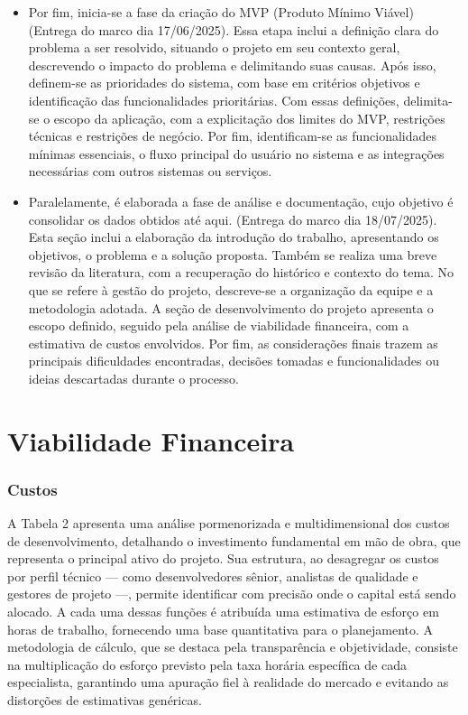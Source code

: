 \documentclass[
	12pt,				%
	openany,			%
	twoside,			%
	a4paper,			%
	english,			%
	brazil				%
	]{abntex2}
\begin{document}
\begin{itemize}
  \item Por fim, inicia-se a fase da criação do MVP (Produto Mínimo Viável) (Entrega do marco dia 17/06/2025). Essa etapa inclui a definição clara do problema a ser resolvido, situando o projeto em seu contexto geral, descrevendo o impacto do problema e delimitando suas causas. Após isso, definem-se as prioridades do sistema, com base em critérios objetivos e identificação das funcionalidades prioritárias. Com essas definições, delimita-se o escopo da aplicação, com a explicitação dos limites do MVP, restrições técnicas e restrições de negócio. Por fim, identificam-se as funcionalidades mínimas essenciais, o fluxo principal do usuário no sistema e as integrações necessárias com outros sistemas ou serviços.

  \item Paralelamente, é elaborada a fase de análise e documentação, cujo objetivo é consolidar os dados obtidos até aqui. (Entrega do marco dia 18/07/2025). Esta seção inclui a elaboração da introdução do trabalho, apresentando os objetivos, o problema e a solução proposta. Também se realiza uma breve revisão da literatura, com a recuperação do histórico e contexto do tema. No que se refere à gestão do projeto, descreve-se a organização da equipe e a metodologia adotada. A seção de desenvolvimento do projeto apresenta o escopo definido, seguido pela análise de viabilidade financeira, com a estimativa de custos envolvidos. Por fim, as considerações finais trazem as principais dificuldades encontradas, decisões tomadas e funcionalidades ou ideias descartadas durante o processo.
\end{itemize}


\chapter{Viabilidade Financeira}

\subsection{Custos}

A Tabela 2 apresenta uma análise pormenorizada e multidimensional dos custos de desenvolvimento, detalhando o investimento fundamental em mão de obra, que representa o principal ativo do projeto. Sua estrutura, ao desagregar os custos por perfil técnico — como desenvolvedores sênior, analistas de qualidade e gestores de projeto —, permite identificar com precisão onde o capital está sendo alocado. A cada uma dessas funções é atribuída uma estimativa de esforço em horas de trabalho, fornecendo uma base quantitativa para o planejamento. A metodologia de cálculo, que se destaca pela transparência e objetividade, consiste na multiplicação do esforço previsto pela taxa horária específica de cada especialista, garantindo uma apuração fiel à realidade do mercado e evitando as distorções de estimativas genéricas.
\end{document}
